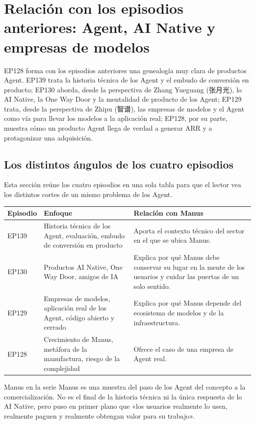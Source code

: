 \section{Relación con los episodios anteriores: Agent, AI Native y empresas de modelos}

EP128 forma con los episodios anteriores una genealogía muy clara de productos Agent. EP139 trata la historia técnica de los Agent y el embudo de conversión en producto; EP130 aborda, desde la perspectiva de Zhang Yueguang (张月光), lo AI Native, la One Way Door y la mentalidad de producto de los Agent; EP129 trata, desde la perspectiva de Zhipu (智谱), las empresas de modelos y el Agent como vía para llevar los modelos a la aplicación real; EP128, por su parte, muestra cómo un producto Agent llega de verdad a generar ARR y a protagonizar una adquisición.

\subsection{Los distintos ángulos de los cuatro episodios}

Esta sección reúne los cuatro episodios en una sola tabla para que el lector vea los distintos cortes de un mismo problema de los Agent.

\begin{longtable}{p{}p{}p{}}
\toprule
Episodio & Enfoque & Relación con Manus \\
\midrule
EP139 & Historia técnica de los Agent, evaluación, embudo de conversión en producto & Aporta el contexto técnico del sector en el que se ubica Manus. \\
EP130 & Productos AI Native, One Way Door, amigos de IA & Explica por qué Manus debe conservar su lugar en la mente de los usuarios y cuidar las puertas de un solo sentido. \\
EP129 & Empresas de modelos, aplicación real de los Agent, código abierto y cerrado & Explica por qué Manus depende del ecosistema de modelos y de la infraestructura. \\
EP128 & Crecimiento de Manus, metáfora de la manufactura, riesgo de la complejidad & Ofrece el caso de una empresa de Agent real. \\
\bottomrule
\end{longtable}

\begin{importantbox}{Manus en la serie}
Manus es una muestra del paso de los Agent del concepto a la comercialización. No es el final de la historia técnica ni la única respuesta de lo AI Native, pero puso en primer plano que «los usuarios realmente lo usen, realmente paguen y realmente obtengan valor para su trabajo».
\end{importantbox}


